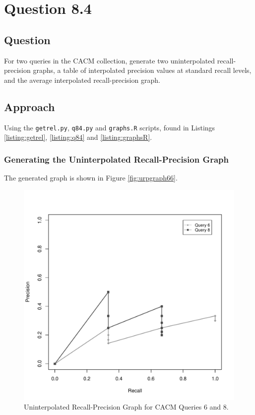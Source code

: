 \section{Question 8.4}


\subsection{Question}
For two queries in the CACM collection, generate two uninterpolated recall-precision graphs, a table of interpolated precision values at standard recall levels, and the average interpolated recall-precision graph.


\subsection{Approach}
Using the \texttt{getrel.py}, \texttt{q84.py} and \texttt{graphs.R} scripts, found in Listings \ref{listing:getrel}, \ref{listing:q84} and \ref{listing:graphsR}.





\subsubsection{Generating the Uninterpolated Recall-Precision Graph}
The generated graph is shown in Figure \ref{fig:urpgraph66}.

\begin{figure}[H]
\centering
\label{fig:urpgraph68}
\includegraphics[scale=.6]{code/getrel/urpg68.pdf}
\caption{Uninterpolated Recall-Precision Graph for CACM Queries 6 and 8.}
\end{figure}


